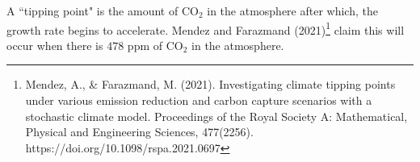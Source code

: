 \documentclass[11pt]{article}
\begin{document}
{{}
\newpage
 \item A ``tipping point" is the amount of CO$_2$ in the atmosphere after which, the growth rate begins to accelerate.  Mendez and Farazmand (2021)\footnote{Mendez, A., \& Farazmand, M. (2021). Investigating climate tipping points under various emission reduction and carbon capture scenarios with a stochastic climate model. Proceedings of the Royal Society A: Mathematical, Physical and Engineering Sciences, 477(2256). https://doi.org/10.1098/rspa.2021.0697} claim this will occur when there is $478$ ppm of CO$_2$ in the atmosphere. 
 }
\end{document}

